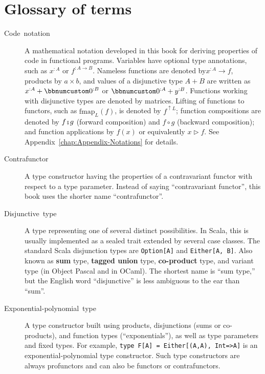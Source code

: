 \chapter{Glossary of terms\label{chap:Appendix-Glossary-of-terms}}
\begin{description}
\item [{Code~notation}] A mathematical notation
developed in this book for deriving properties of code in functional
programs. Variables have optional type annotations, such as $x^{:A}$
or $f^{:A\rightarrow B}$. Nameless functions are denoted by$x^{:A}\rightarrow f$,
products by $a\times b$, and values of a disjunctive type $A+B$
are written as $x^{:A}+\bbnum 0^{:B}$ or $\bbnum 0^{:A}+y^{:B}$.
Functions working with disjunctive types are denoted by matrices.
Lifting of functions to functors, such as $\text{fmap}_{L}(f)$, is
denoted by $f^{\uparrow L}$; function compositions are denoted by
$f\bef g$ (forward composition) and $f\circ g$ (backward composition);
and function applications by $f(x)$ or equivalently $x\triangleright f$.
See Appendix~\ref{chap:Appendix-Notations} for details.
\item [{Contrafunctor}] A type constructor having
the properties of a contravariant functor
with respect to a type parameter. Instead of saying ``contravariant
functor'', this book uses the shorter name ``contrafunctor''.
\item [{Disjunctive~type}] A type representing
one of several distinct possibilities. In Scala, this is usually implemented
as a sealed trait extended by several case classes. The standard Scala
disjunction types are \lstinline!Option[A]! and \lstinline!Either[A, B]!.
Also known as \textbf{sum
}type, \textbf{tagged union}
type, \textbf{co-product}
type, and variant type (in Object Pascal and in OCaml). The shortest
name is ``sum type,'' but the English word ``disjunctive'' is
less ambiguous to the ear than ``sum''.
\item [{Exponential-polynomial~type}] A
type constructor built using products, disjunctions (sums or co-products),
and function types (``exponentials''), as well as type parameters
and fixed types. For example,  \lstinline!type F[A] = Either[(A,A), Int=>A]!
is an exponential-polynomial type constructor. Such type constructors
are always profunctors and can also be functors or contrafunctors.

\end{description}
